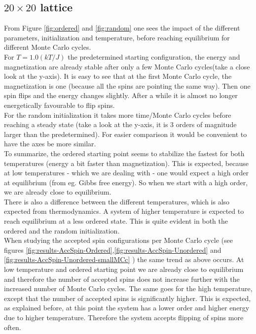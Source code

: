 \documentclass[../main.tex]{subfiles}
\begin{document}
\subsection{$20 \times 20$ lattice}
From Figure \ref{fig:ordered} and \ref{fig:random} one sees the impact of the different parameters, initialization and temperature, before reaching equilibrium for different Monte Carlo cycles. \\
For $T=1.0(kT/J)$ the predetermined starting configuration, the energy and magnetization are already stable after only a few Monte Carlo cycles(take a close look at the y-axis). It is easy to see that at the first Monte Carlo cycle, the magnetization is one (because all the spins are pointing the same way). Then one spin flips and the energy changes slightly. After a while it is almost no longer energetically favourable to flip spins. \\
For the random initialization it takes more time/Monte Carlo cycles before reaching a steady state (take a look at the y-axis, it is 3 orders of magnitude larger than the predetermined). For easier comparison it would be convenient to have the axes be more similar. \\
To summarize, the ordered starting point seems to stabilize the fastest for both temperatures (energy a bit faster than magnetization). This is expected, because at low temperatures - which we are dealing with - one would expect a high order at equilibrium (from eg. Gibbs free energy). So when we start with a high order, we are already close to equilibrium. \\
There is also a difference between the different temperatures, which is also expected from thermodynamics. A system of higher temperature is expected to reach equilibrium at a less ordered state. This is quite evident in both the ordered and the random initialization. \\
When studying the accepted spin configurations per Monte Carlo cycle (see figures \ref{fig:results-AccSpin-Ordered},\ref{fig:results-AccSpin-Unordered} and \ref{fig:results-AccSpin-Unordered-smallMCc} ) the same trend as above occurs. At low temperature and ordered starting point we are already close to equilibrium and therefore the number of accepted spins does not increase further with the increased number of Monte Carlo cycles. The same goes for the high temperature, except that the number of accepted spins is significantly higher. This is expected, as explained before, at this point the system has a lower order and higher energy due to higher temperature. Therefore the system accepts flipping of spins more often.
\end{document}
